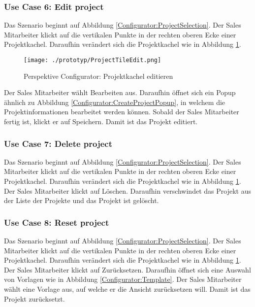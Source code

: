 \subsubsection{Use Case 6: Edit project}

Das Szenario beginnt auf Abbildung \ref{Configurator:ProjectSelection}. Der Sales Mitarbeiter klickt auf die vertikalen Punkte in der rechten oberen Ecke einer Projektkachel. Daraufhin verändert sich die Projektkachel wie in Abbildung \ref{Configurator:ProjectTileEdit}.

\begin{figure}[ht]
  \centering
  \texttt{[image: ./prototyp/ProjectTileEdit.png]}
  \caption{Perspektive Configurator: Projektkachel editieren}
  \label{Configurator:ProjectTileEdit}
\end{figure}

Der Sales Mitarbeiter wählt Bearbeiten aus. Daraufhin öffnet sich ein Popup ähnlich zu Abbildung \ref{Configurator:CreateProjectPopup}, in welchem die Projektinformationen bearbeitet werden können. Sobald der Sales Mitarbeiter fertig ist, klickt er auf Speichern. Damit ist das Projekt editiert.

\subsubsection{Use Case 7: Delete project}

Das Szenario beginnt auf Abbildung \ref{Configurator:ProjectSelection}. Der Sales Mitarbeiter klickt auf die vertikalen Punkte in der rechten oberen Ecke einer Projektkachel. Daraufhin verändert sich die Projektkachel wie in Abbildung \ref{Configurator:ProjectTileEdit}. Der Sales Mitarbeiter klickt auf Löschen. Daraufhin verschwindet das Projekt aus der Liste der Projekte und das Projekt ist gelöscht.
\subsubsection{Use Case 8: Reset project}

Das Szenario beginnt auf Abbildung \ref{Configurator:ProjectSelection}. Der Sales Mitarbeiter klickt auf die vertikalen Punkte in der rechten oberen Ecke einer Projektkachel. Daraufhin verändert sich die Projektkachel wie in Abbildung \ref{Configurator:ProjectTileEdit}. Der Sales Mitarbeiter klickt auf Zurücksetzen. Daraufhin öffnet sich eine Auswahl von Vorlagen wie in Abbildung \ref{Configurator:Template}. Der Sales Mitarbeiter wählt eine Vorlage aus, auf welche er die Ansicht zurücksetzen will. Damit ist das Projekt zurücksetzt.


